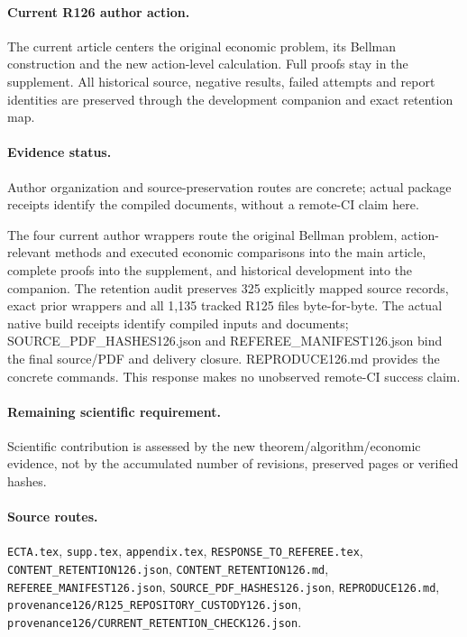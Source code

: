 \paragraph{Current R126 author action.} The current article centers the original economic problem, its Bellman construction and the new action-level calculation. Full proofs stay in the supplement. All historical source, negative results, failed attempts and report identities are preserved through the development companion and exact retention map.

\paragraph{Evidence status.} Author organization and source-preservation routes are concrete; actual package receipts identify the compiled documents, without a remote-CI claim here.

The four current author wrappers route the original Bellman problem, action-relevant methods and executed economic comparisons into the main article, complete proofs into the supplement, and historical development into the companion. The retention audit preserves 325 explicitly mapped source records, exact prior wrappers and all 1,135 tracked R125 files byte-for-byte. The actual native build receipts identify compiled inputs and documents; SOURCE\_PDF\_HASHES126.json and REFEREE\_MANIFEST126.json bind the final source/PDF and delivery closure. REPRODUCE126.md provides the concrete commands. This response makes no unobserved remote-CI success claim.\par

\paragraph{Remaining scientific requirement.} Scientific contribution is assessed by the new theorem/algorithm/economic evidence, not by the accumulated number of revisions, preserved pages or verified hashes.

\paragraph{Source routes.} \nolinkurl{ECTA.tex}, \nolinkurl{supp.tex}, \nolinkurl{appendix.tex}, \nolinkurl{RESPONSE_TO_REFEREE.tex}, \nolinkurl{CONTENT_RETENTION126.json}, \nolinkurl{CONTENT_RETENTION126.md}, \nolinkurl{REFEREE_MANIFEST126.json}, \nolinkurl{SOURCE_PDF_HASHES126.json}, \nolinkurl{REPRODUCE126.md}, \nolinkurl{provenance126/R125_REPOSITORY_CUSTODY126.json}, \nolinkurl{provenance126/CURRENT_RETENTION_CHECK126.json}.

